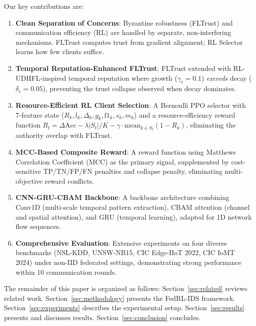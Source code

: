 \documentclass[conference]{IEEEtran}
\begin{document}
Our key contributions are:

\begin{enumerate}
    \item \textbf{Clean Separation of Concerns}: Byzantine robustness (FLTrust) and communication efficiency (RL) are handled by separate, non-interfering mechanisms. FLTrust computes trust from gradient alignment; RL Selector learns how few clients suffice.

    \item \textbf{Temporal Reputation-Enhanced FLTrust}: FLTrust extended with RL-UDHFL-inspired temporal reputation where growth ($\gamma_r=0.1$) \emph{exceeds} decay ($\delta_r=0.05$), preventing the trust collapse observed when decay dominates.

    \item \textbf{Resource-Efficient RL Client Selection}: A Bernoulli PPO selector with 7-feature state ($R_k, l_k, \Delta_k, g_k, \mathrm{f1}_k, s_k, m_k$) and a resource-efficiency reward function $R_t = \Delta\mathrm{Acc} - \lambda|S_t|/K - \gamma \cdot \mathrm{mean}_{k\in S_t}(1 - R_k)$, eliminating the authority overlap with FLTrust.

    \item \textbf{MCC-Based Composite Reward}: A reward function using Matthews Correlation Coefficient (MCC) as the primary signal, supplemented by cost-sensitive TP/TN/FP/FN penalties and collapse penalty, eliminating multi-objective reward conflicts.

    \item \textbf{CNN-GRU-CBAM Backbone}: A backbone architecture combining Conv1D (multi-scale temporal pattern extraction), CBAM attention (channel and spatial attention), and GRU (temporal learning), adapted for 1D network flow sequences.

    \item \textbf{Comprehensive Evaluation}: Extensive experiments on four diverse benchmarks (NSL-KDD, UNSW-NB15, CIC Edge-IIoT 2022, CIC IoMT 2024) under non-IID federated settings, demonstrating strong performance within 10 communication rounds.
\end{enumerate}

The remainder of this paper is organized as follows: Section~\ref{sec:related} reviews related work. Section~\ref{sec:methodology} presents the FedRL-IDS framework. Section~\ref{sec:experiments} describes the experimental setup. Section~\ref{sec:results} presents and discusses results. Section~\ref{sec:conclusion} concludes.
\end{document}
